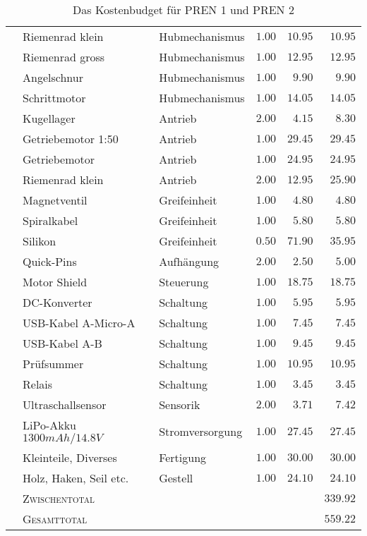 \begin{table}
\begin{tabular}{l|l|l|r|r|r}
            & Riemenrad klein & Hubmechanismus & $1.00$ & $10.95$ & $10.95$ \\
            & Riemenrad gross & Hubmechanismus & $1.00$ & $12.95$ & $12.95$ \\
            & Angelschnur & Hubmechanismus & $1.00$ & $9.90$ & $9.90$ \\
            & Schrittmotor & Hubmechanismus & $1.00$ & $14.05$ & $14.05$ \\
            & Kugellager & Antrieb & $2.00$ & $4.15$ & $8.30$ \\
            & Getriebemotor 1:50 & Antrieb & $1.00$ & $29.45$ & $29.45$ \\
            & Getriebemotor & Antrieb & $1.00$ & $24.95$ & $24.95$ \\
            & Riemenrad klein & Antrieb & $2.00$ & $12.95$ & $25.90$ \\
            & Magnetventil & Greifeinheit & $1.00$ & $4.80$ & $4.80$ \\
            & Spiralkabel & Greifeinheit & $1.00$ & $5.80$ & $5.80$ \\
            & Silikon & Greifeinheit & $0.50$ & $71.90$ & $35.95$ \\
            & Quick-Pins & Aufhängung & $2.00$ & $2.50$ & $5.00$ \\
            & Motor Shield & Steuerung & $1.00$ & $18.75$ & $18.75$ \\
            & DC-Konverter & Schaltung & $1.00$ & $5.95$ & $5.95$ \\
            & USB-Kabel A-Micro-A & Schaltung & $1.00$ & $7.45$ & $7.45$ \\
            & USB-Kabel A-B & Schaltung & $1.00$ & $9.45$ & $9.45$ \\
            & Prüfsummer & Schaltung & $1.00$ & $10.95$ & $10.95$ \\
            & Relais & Schaltung & $1.00$ & $3.45$ & $3.45$ \\
            & Ultraschallsensor & Sensorik & $2.00$ & $3.71$ & $7.42$ \\
            & LiPo-Akku $1300mAh/14.8V$ & Stromversorgung & $1.00$ & $27.45$ & $27.45$ \\
            & Kleinteile, Diverses & Fertigung & $1.00$ & $30.00$ & $30.00$ \\
            & Holz, Haken, Seil etc. & Gestell & $1.00$ & $24.10$ & $24.10$ \\
            & \textsc{Zwischentotal} & & & & $\boldsymbol{339.92}$ \\
            \hline
        & \textsc{Gesamttotal} & & & & $\boldsymbol{559.22}$
    \end{tabular}
    \caption{Das Kostenbudget für PREN 1 und PREN 2\label{tbl:kostenbudget}}
\end{table}

